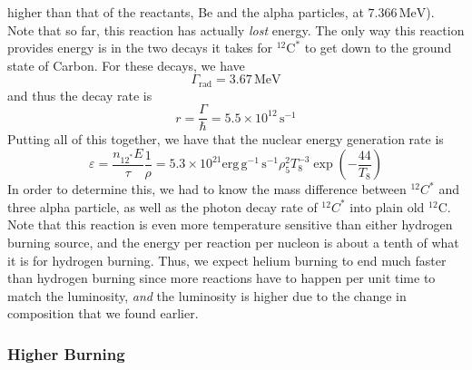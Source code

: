\documentclass[10pt]{article}
\numberwithin{equation}{section}
\begin{document}
    higher than that of the reactants, Be and the alpha particles, at
    $7.366\,\mathrm{MeV}$). Note that so far, this reaction has
    actually \emph{lost} energy. The only way this reaction provides
    energy is in the two decays it takes for ${}^{12}\mathrm{C}^*$ to
    get down to the ground state of Carbon. For these decays, we have
    \begin{equation}
      \label{eq:272}
      \Gamma_{\mathrm{rad}}=3.67\,\mathrm{MeV}
    \end{equation}
    and thus the decay rate is
    \begin{equation}
      \label{eq:273}
      r=\frac{\Gamma}{\hbar}=5.5 \times 10^{12}\,\mathrm{s^{-1}}
    \end{equation}
    Putting all of this together, we have that the nuclear energy
    generation rate is
    \begin{equation}
      \label{eq:274}
      \varepsilon = \frac{n_{12^*}E}{\tau}\frac{1}{\rho}=5.3\times 10^
{21}\mathrm{erg\,g^{-1}\,s^{-1}}\rho_5^2T_8^{-3}\exp\left(-\frac{44}
{T_8}\right)
    \end{equation}
    In order to determine this, we had to know the mass difference
    between ${}^{12}C^*$ and three alpha particle, as well as the
    photon decay rate of ${}^{12}C^*$ into plain old
    $^{12}\mathrm{C}$. Note that this reaction is even more
    temperature sensitive than either hydrogen burning source, and the
    energy per reaction per nucleon is about a tenth of what it is for
    hydrogen burning. Thus, we expect helium burning to end much
    faster than hydrogen burning since more reactions have to happen
    per unit time to match the luminosity, \emph{and} the luminosity
    is higher due to the change in composition that we found earlier.\\
    
    \subsubsection{Higher Burning}
    \label{sec:higher-burning-1}
\end{document}
